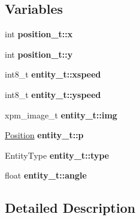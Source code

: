 \subsection*{Variables}
\begin{DoxyCompactItemize}
\item 
\mbox{\label{group__Entity_ga6f81865a98e5c5ee33d6bf42dd4efe06}} 
int {\bfseries position\+\_\+t\+::x}
\item 
\mbox{\label{group__Entity_gacfe2d471728cfdd56a9f910e4e697a17}} 
int {\bfseries position\+\_\+t\+::y}
\item 
\mbox{\label{group__Entity_gaf3535ae8987528139ed018f67e0299c5}} 
int8\+\_\+t {\bfseries entity\+\_\+t\+::xspeed}
\item 
\mbox{\label{group__Entity_gaa85a1163b524fa879b9247bc944a5d3a}} 
int8\+\_\+t {\bfseries entity\+\_\+t\+::yspeed}
\item 
\mbox{\label{group__Entity_ga6c65739e5d8b544730bd249d2cafcc7e}} 
xpm\+\_\+image\+\_\+t {\bfseries entity\+\_\+t\+::img}
\item 
\mbox{\label{group__Entity_ga9a3515fb669dd89bb37445903d4d6112}} 
\hyperlink{structposition__t}{Position} {\bfseries entity\+\_\+t\+::p}
\item 
\mbox{\label{group__Entity_ga1f5add91639af1a6dc1a99b3093db7d1}} 
Entity\+Type {\bfseries entity\+\_\+t\+::type}
\item 
\mbox{\label{group__Entity_ga8105e6e206668a1a7a73358f94faf227}} 
float {\bfseries entity\+\_\+t\+::angle}
\end{DoxyCompactItemize}


\subsection{Detailed Description}
